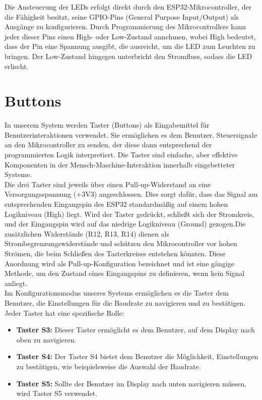 \noindent Die Ansteuerung der LEDs erfolgt direkt durch den ESP32-Mikrocontroller, der die Fähigkeit besitzt, seine GPIO-Pins (General Purpose Input/Output) als Ausgänge zu konfigurieren. Durch Programmierung des Mikrocontrollers kann jeder dieser Pins einen High- oder Low-Zustand annehmen, wobei High bedeutet, dass der Pin eine Spannung ausgibt, die ausreicht, um die LED zum Leuchten zu bringen. Der Low-Zustand hingegen unterbricht den Stromfluss, sodass die LED erlischt.\\


\section{Buttons}
\noindent In unserem System werden Taster (Buttons) als Eingabemittel für Benutzerinteraktionen verwendet. Sie ermöglichen es dem Benutzer, Steuersignale an den Mikrocontroller zu senden, der diese dann entsprechend der programmierten Logik interpretiert. Die Taster sind einfache, aber effektive Komponenten in der Mensch-Maschine-Interaktion innerhalb eingebetteter Systeme.\\

\noindent Die drei Taster sind jeweils über einen Pull-up-Widerstand an eine Versorgungsspannung (+3V3) angeschlossen. Dies sorgt dafür, dass das Signal am entsprechenden Eingangspin des ESP32 standardmäßig auf einem hohen Logikniveau (High) liegt. Wird der Taster gedrückt, schließt sich der Stromkreis, und der Eingangspin wird auf das niedrige Logikniveau (Ground) gezogen.Die zusätzlichen Widerstände (R12, R13, R14) dienen als Strombegrenzungswiderstände und schützen den Mikrocontroller vor hohen Strömen, die beim Schließen des Tasterkreises entstehen könnten. Diese Anordnung wird als Pull-up-Konfiguration bezeichnet und ist eine gängige Methode, um den Zustand eines Eingangspins zu definieren, wenn kein Signal anliegt.\\

\noindent Im Konfigurationsmodus unseres Systems ermöglichen es die Taster dem Benutzer, die Einstellungen für die Baudrate zu navigieren und zu bestätigen. Jeder Taster hat eine spezifische Rolle:

\begin{itemize}
  \item \textbf{Taster S3:} Dieser Taster ermöglicht es dem Benutzer, auf dem Display nach oben zu navigieren.
  
  \item \textbf{Taster S4:} Der Taster S4 bietet dem Benutzer die Möglichkeit, Einstellungen zu bestätigen, wie beispielsweise die Auswahl der Baudrate.
  
  \item \textbf{Taster S5:} Sollte der Benutzer im Display nach unten navigieren müssen, wird Taster S5 verwendet.
\end{itemize}


